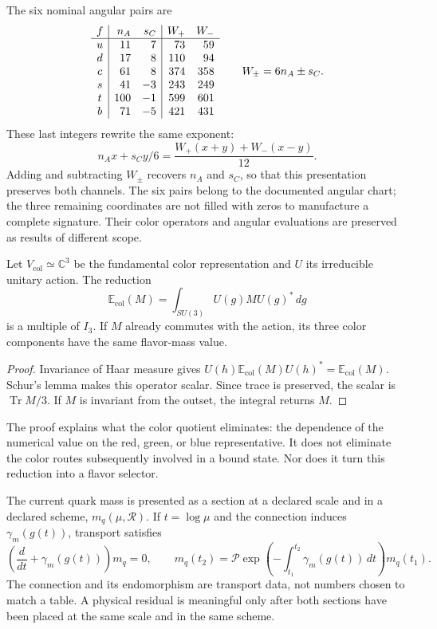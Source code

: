 The six nominal angular pairs are
\[
\begin{array}{c|r r|r r}
 f&n_A&s_C&W_+&W_-\\\hline
 u&11&7&73&59\\
 d&17&8&110&94\\
 c&61&8&374&358\\
 s&41&-3&243&249\\
 t&100&-1&599&601\\
 b&71&-5&421&431
\end{array}
\qquad W_\pm=6n_A\pm s_C.
\]
These last integers rewrite the same exponent:
\[
 n_Ax+s_Cy/6
 =\frac{W_+(x+y)+W_-(x-y)}{12}.
\]
Adding and subtracting \(W_\pm\) recovers \(n_A\) and \(s_C\), so that
this presentation preserves both channels. The six pairs belong
to the documented angular chart; the three remaining coordinates
are not filled with zeros to manufacture a complete signature. Their color
operators and angular evaluations are preserved as results of
different scope.

\begin{proposition}
\label{vi:vi:prop:masa-color}
Let \(V_{\mathrm{col}}\simeq\mathbb C^3\) be the fundamental color
representation and \(U\) its irreducible unitary action. The reduction
\[
 \mathbb E_{\mathrm{col}}(M)=
 \int_{SU(3)}U(g)MU(g)^*\,dg
\]
is a multiple of \(I_3\). If \(M\) already commutes with the action, its three
color components have the same flavor-mass value.
\end{proposition}
\begin{proof}
Invariance of Haar measure gives
\(U(h)\mathbb E_{\mathrm{col}}(M)U(h)^*=
\mathbb E_{\mathrm{col}}(M)\). Schur's lemma makes this
operator scalar. Since trace is preserved, the scalar is
\(\operatorname{Tr}M/3\). If \(M\) is invariant from the outset,
the integral returns \(M\).
\end{proof}

The proof explains what the color quotient eliminates: the dependence of
the numerical value on the red, green, or blue representative. It does not eliminate the
color routes subsequently involved in a bound state. Nor does it
turn this reduction into a flavor selector.

The current quark mass is presented as a section at a declared scale and in a declared
scheme, \(m_q(\mu,\mathscr R)\). If \(t=\log\mu\) and the connection
induces \(\gamma_m(g(t))\), transport satisfies
\[
 \left(\frac{d}{dt}+\gamma_m(g(t))\right)m_q=0,
 \qquad
 m_q(t_2)=\mathcal P\exp\left(-\int_{t_1}^{t_2}
 \gamma_m(g(t))\,dt\right)m_q(t_1).
\]
The connection and its endomorphism are transport data, not numbers
chosen to match a table. A physical residual is meaningful only
after both sections have been placed at the same scale and in the same scheme.

